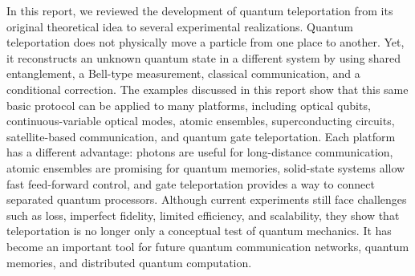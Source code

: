 \documentclass[aps,prd,preprint,floats,epsf,superscriptaddress,nofootinbib]{revtex4}
\begin{document}
In this report, we reviewed the development of quantum teleportation from its original theoretical idea\cite{Bennett} to several experimental realizations.
Quantum teleportation does not physically move a particle from one place to another. Yet, it reconstructs an unknown quantum state in a different system by using shared entanglement, a Bell-type measurement, classical communication, and a conditional correction. 
The examples discussed in this report show that this same basic protocol can be applied to many platforms, including optical qubits, continuous-variable optical modes, atomic ensembles, superconducting circuits, satellite-based communication, and quantum gate teleportation.
Each platform has a different advantage: photons are useful for long-distance communication, atomic ensembles are promising for quantum memories, solid-state systems allow fast feed-forward control, and gate teleportation provides a way to connect separated quantum processors. 
Although current experiments still face challenges such as loss, imperfect fidelity, limited efficiency, and scalability, they show that teleportation is no longer only a conceptual test of quantum mechanics. It has become an important tool for future quantum communication networks, quantum memories, and distributed quantum computation.


\newpage
\renewcommand{\bibsection}{\section*{References}}



\end{document}
